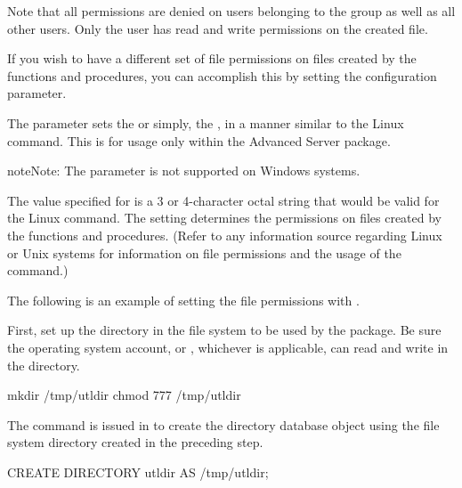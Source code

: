 \documentclass[letterpaper,10pt,english,openany,oneside]{sphinxmanual}
\begin{document}
Note that all permissions are denied on users belonging to the
 group as well as all other users. Only the 
user has read and write permissions on the created file.

If you wish to have a different set of file permissions on files created
by the  functions and procedures, you can accomplish this by
setting the  configuration parameter.

The  parameter sets the  or
simply, the , in a manner similar to the Linux  command. This
is for usage only within the Advanced Server  package.

\begin{sphinxadmonition}{note}{Note:}
The  parameter is not supported on Windows systems.
\end{sphinxadmonition}

The value specified for  is a 3 or 4-character octal
string that would be valid for the Linux  command. The setting
determines the permissions on files created by the  functions
and procedures. (Refer to any information source regarding Linux or Unix
systems for information on file permissions and the usage of the 
command.)

The following is an example of setting the file permissions with
.

First, set up the directory in the file system to be used by the
 package. Be sure the operating system account,  or
, whichever is applicable, can read and write in the directory.

%
\begin{sphinxVerbatim}[commandchars=\\\{\}]
mkdir /tmp/utldir
chmod 777 /tmp/utldir
\end{sphinxVerbatim}

The  command is issued in  to create the directory
database object using the file system directory created in the preceding
step.

%
\begin{sphinxVerbatim}[commandchars=\\\{\}]
CREATE DIRECTORY utldir AS \PYGZsq{}/tmp/utldir\PYGZsq{};
\end{sphinxVerbatim}
\end{document}

